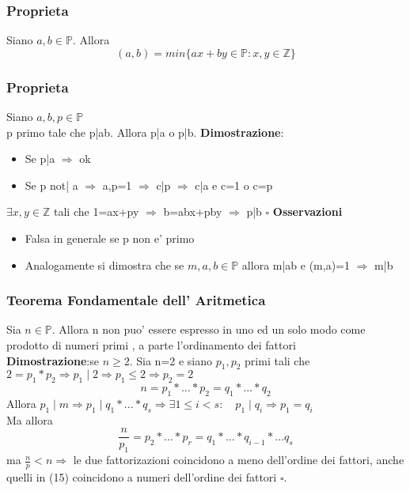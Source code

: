 \documentclass{article}
\begin{document}
    \subsubsection{Proprieta}
    \begin{flushleft}
      Siano $a,b \in \mathbb{P}$. Allora
      \begin{equation}
        (a,b)=min\{ax+by \in \mathbb{P}:x,y \in \mathbb{Z}\}
      \end{equation}
    \end{flushleft}
    \subsubsection{Proprieta}
    \begin{flushleft}
      Siano $a,b,p \in \mathbb{P}$ \\ 
      p primo tale che p|ab. Allora p|a o p|b.
      \textbf{Dimostrazione}: 
      \begin{itemize}
        \item Se p|a $\Rightarrow$ ok \\ 
        \item Se p not| a $\Rightarrow$ a,p=1 $\Rightarrow$ c|p $\Rightarrow$ c|a e c=1 o c=p
      \end{itemize}
      $\exists x,y \in \mathbb{Z}$ tali che 1=ax+py $\Rightarrow$ b=abx+pby $\Rightarrow$ p|b $\square$
      \textbf{Osservazioni}
      \begin{itemize}
        \item Falsa in generale se p non e' primo
        \item Analogamente si dimostra che se $m,a,b \in \mathbb{P}$ allora m|ab e (m,a)=1 $\Rightarrow$ m|b
      \end{itemize}
    \end{flushleft}
    \subsubsection{Teorema Fondamentale dell' Aritmetica}
    \begin{flushleft}
      Sia $n\in \mathbb{P}$. Allora n non puo' essere espresso in uno ed un solo modo come prodotto di numeri primi , a parte l'ordinamento dei fattori\\ 
      \textbf{Dimostrazione}:se $n \geq 2$. Sia n=2 e siano $p_1,p_2$ primi tali che $2=p_1*p_2 \Rightarrow p_1 \mid 2 \Rightarrow p_1 \leq 2 \Rightarrow p_2 = 2$
      \begin{equation}
       n=p_1*...*p_2=q_1*...*q_2 
      \end{equation}
      Allora $p_1 \mid m \Rightarrow p_1 \mid q_1*...*q_s \Rightarrow \exists 1\leq i < s : \quad p_1 \mid q_i \Rightarrow p_1=q_i$\\ 
      Ma allora
      \begin{equation}
        \frac{n}{p_1}=p_2*...*p_r=q_1*...*q_{i-1}*...q_s 
      \end{equation}
      ma $\frac{n}{p} < n \Rightarrow $ le due fattorizazioni coincidono a meno dell'ordine dei fattori, anche quelli in (15) coincidono a numeri
      dell'ordine dei fattori $\square$.
    \end{flushleft}
\end{document}
